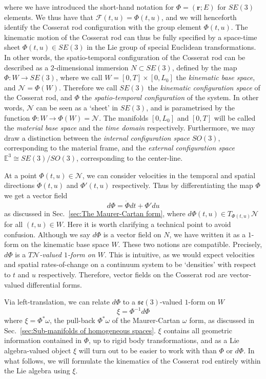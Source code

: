 where we have introduced the short-hand notation for $\Phi = (\mathbf{r} ; E)$ for $SE(3)$ elements. We thus have that $\mathcal{F}(t,u) = \Phi(t,u)$, and we will henceforth identify the Cosserat rod configuration with the group element $\Phi(t,u)$. The kinematic motion of the Cosserat rod can thus be fully specified by a space-time sheet $\Phi(t, u) \in SE(3)$ in the Lie group of special Euclidean transformations. In other words, the spatio-temporal configuration of the Cosserat rod can be described as a $2$-dimensional immersion $N \subset SE(3)$, defined by the map $\Phi : W \to SE(3)$, where we call $W = [0, T] \times [0, L_0]$ the \textit{kinematic base space}, and $\mathscr{N} = \Phi(W)$. Therefore we call $SE(3)$ the \textit{kinematic configuration space} of the Cosserat rod, and $\Phi$ the \textit{spatio-temporal configuration} of the system. In other words, $\mathscr{N}$ can be seen as a `sheet' in $SE(3)$, and is parametrised by the function $\Phi : W \to \Phi(W) = \mathscr{N}$. The manifolds $[0, L_0]$ and $[0, T]$ will be called the \textit{material base space} and the \textit{time domain} respectively. Furthermore, we may draw a distinction between the \textit{internal configuration space} $SO(3)$, corresponding to the material frame, and the \textit{external configuration space} $\mathbb{E}^3 \cong SE(3) / SO(3)$, corresponding to the center-line.

At a point $\Phi(t, u) \in \mathscr{N}$, we can consider velocities in the temporal and spatial directions $\dot{\Phi}(t, u)$ and $\Phi'(t, u)$ respectively. Thus by differentiating the map $\Phi$ we get a vector field
\begin{equation}
d\Phi = \dot{\Phi} dt + \Phi' du
\end{equation}
as discussed in Sec.~\ref{sec:The Maurer-Cartan form}, where $d \Phi(t, u) \in T_{\Phi(t, u)} \mathscr{N}$ for all $(t, u) \in W$. Here it is worth clarifying a technical point to avoid confusion. Although we say $d \Phi$ is a vector field on $N$, we have written it as a $1$-form on the kinematic base space $W$. These two notions are compatible. Precisely, $d\Phi$ is a \textit{$T\mathscr{N}$-valued $1$-form on $W$}. This is intuitive, as we would expect velocities and spatial rates-of-change on a continuum system to be `densities' with respect to $t$ and $u$ respectively. Therefore, vector fields on the Cosserat rod are vector-valued differential forms.

Via left-translation, we can relate $d \Phi$ to a $\mathfrak{se}(3)$-valued $1$-form on $W$
\begin{equation} \label{eq:xi from phi}
\xi = \Phi^{-1} d \Phi
\end{equation}
where $\xi = \Phi^* \omega$, the pull-back $\Phi^* \omega$ of the Maurer-Cartan $\omega$ form, as discussed in Sec.~\ref{sec:Sub-manifolds of homogeneous spaces}. $\xi$ contains all geometric information contained in $\Phi$, up to rigid body transformations, and as a Lie algebra-valued object $\xi$ will turn out to be easier to work with than $\Phi$ or $d \Phi$. In what follows, we will formulate the kinematics of the Cosserat rod entirely within the Lie algebra using $\xi$.

